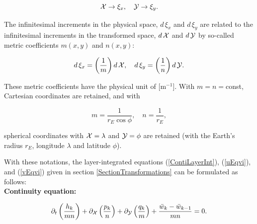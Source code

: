 \begin{equation}\label{calXYdef} 
{\cal X} \rightarrow \xi_x,\quad {\cal Y} \rightarrow \xi_y. 
\end{equation}

The infinitesimal increments in the physical space,
$d\,\xi_x$ and $d\,\xi_y$ are related to the 
infinitesimal increments in the transformed space,
$d\,{\cal X}$ and $d\,{\cal Y}$ by so-called metric 
coefficients $m(x,y)$ and $n(x,y)$:

\begin{equation}\label{curvidef} 
d\,\xi_x = \left(\frac{1}{m} \right) d\,{\cal X}, \quad
d\,\xi_y = \left(\frac{1}{n} \right) d\,{\cal Y}. 
\end{equation}

These metric coefficients have the physical unit of [m$^{-1}$].  
With $m=n=$const, Cartesian coordinates are retained, and with

\begin{equation}\label{rE} 
m=\frac{1}{r_E\cos\phi},\quad n=\frac{1}{r_E},
\end{equation}

spherical coordinates with ${\cal X}=\lambda$\label{lambda}
and ${\cal Y}=\phi$
are retained 
(with the Earth's radius $r_E$, longitude $\lambda$ and
latitude $\phi$). 

With these notations, the layer-integrated equations 
(\ref{ContiLayerInt}), (\ref{uEqvi}), and (\ref{vEqvi}) given
in section \ref{SectionTransformations} can be formulated as 
follows: \\ 

{\bf Continuity equation:} 

\begin{equation}\label{ContiLayerIntCurvi}
\partial_t \left(\frac{h_k}{mn}\right) 
+ \partial_{\cal X} \left(\frac{p_k}{n} \right)
+ \partial_{\cal Y} \left(\frac{q_k}{m} \right)
+ \frac{\bar w_k - \bar w_{k-1}}{mn}=0.
\end{equation}

